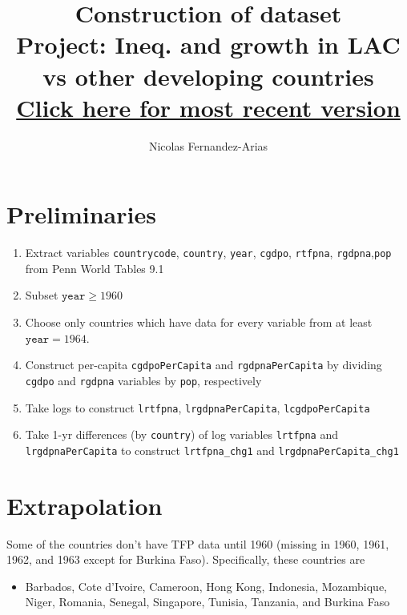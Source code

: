 \documentclass[12pt,english]{article}
\theoremstyle{remark}
\begin{document}
	
\title{Construction of dataset\\ \small Project: Ineq. and growth in LAC vs other developing countries \\ \href{https://drive.google.com/open?id=1hGUyztXgF7xwMnW3oJiBXJfl9bk7-Gi-}{Click here for most recent version}}
\author{Nicolas Fernandez-Arias}
\maketitle

\section{Preliminaries}

\begin{enumerate}
	\item Extract variables \texttt{countrycode}, \texttt{country}, \texttt{year}, \texttt{cgdpo}, \texttt{rtfpna}, \texttt{rgdpna},\texttt{pop} from Penn World Tables 9.1
	\item Subset $\texttt{year} \ge 1960$
	\item Choose only countries which have data for every variable from at least $\texttt{year} = 1964$.
	\item Construct per-capita \texttt{cgdpoPerCapita} and \texttt{rgdpnaPerCapita} by dividing \texttt{cgdpo} and \texttt{rgdpna} variables by \texttt{pop}, respectively
	\item Take logs to construct \texttt{lrtfpna}, \texttt{lrgdpnaPerCapita}, \texttt{lcgdpoPerCapita} 
	\item Take 1-yr differences (by \texttt{country}) of log variables \texttt{lrtfpna} and \texttt{lrgdpnaPerCapita} to construct \texttt{lrtfpna\_chg1} and \texttt{lrgdpnaPerCapita\_chg1}
\end{enumerate}

\section{Extrapolation}

Some of the countries don't have TFP data until 1960 (missing in 1960, 1961, 1962, and 1963 except for Burkina Faso). Specifically, these countries are 
\begin{itemize}
	\item Barbados, Cote d'Ivoire, Cameroon, Hong Kong, Indonesia, Mozambique, Niger, Romania, Senegal, Singapore, Tunisia, Tanzania, and Burkina Faso
\end{itemize}
\end{document}
